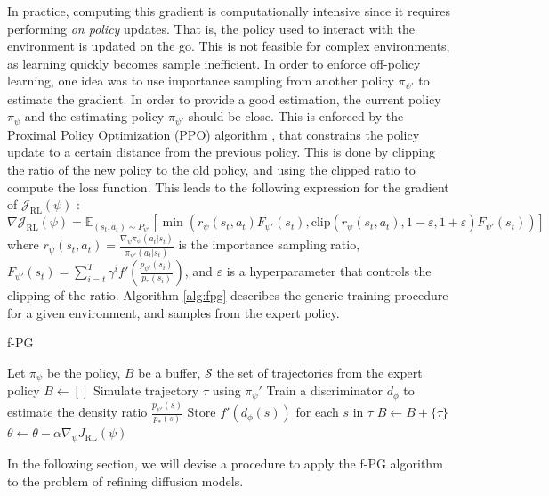 In practice, computing this gradient is computationally intensive since it requires performing \textit{on policy} updates. That is, the policy used to interact with the environment is updated on the go. This is not feasible for complex environments, as learning quickly becomes sample inefficient.
In order to enforce off-policy learning, one idea \citep{agarwal_f-policy_2023} was to use importance sampling from another policy $\pi_{\psi'}$ to estimate the gradient. In order to provide a good estimation, the current policy $\pi_{\psi}$ and the estimating policy $\pi_{\psi'}$ should be close. This is enforced by the Proximal Policy Optimization (PPO) algorithm \citep{schulman2017proximal}, that constrains the policy update to a certain distance from the previous policy. This is done by clipping the ratio of the new policy to the old policy, and using the clipped ratio to compute the loss function. This leads to the following expression for the gradient of $\mathcal{J}_{\mathrm{RL}}(\psi)$ :
\begin{equation}
    \nabla  \mathcal{J}_{\mathrm{RL}}(\psi) =  \mathbb{E}_{(s_{t},a_{t}) \sim P_{ \psi'}} \left[  \min\left(r_{\psi}(s_{t},a_{t})F_{\psi'}(s_{t}),\mathrm{clip}\left(r_{\psi}(s_{t},a_{t}),1-\varepsilon,1+\varepsilon\right)F_{\psi'}(s_{t}) \right)  \right]
\end{equation}
where $r_{\psi}(s_{t},a_{t}) = \frac{\nabla_{\psi} \pi_{\psi}(a_{t}|s_{t})}{\pi_{\psi'}(a_{t}|s_{t})}$ is the importance sampling ratio, $F_{\psi'}(s_{t}) = \sum_{i=t}^{T} \gamma^{i} f'\left( \frac{p_{\psi'}(s_{i})}{p_{*}(s_{i})} \right)$, and $\varepsilon$ is a hyperparameter that controls the clipping of the ratio. Algorithm \ref*{alg:fpg} describes the generic training procedure for a given environment, and samples from the expert policy.
\begin{algorithm}
    \caption{f-PG}
    \label{alg:fpg}
    \begin{algorithmic}[1]
    \State Let $\pi_\psi$ be the policy, $B$ be a buffer, $\mathcal{S}$ the set of trajectories from the expert policy
        \State $B \leftarrow []$
            \State Simulate trajectory $\tau$ using $\pi_\psi'$
            \State Train a discriminator $d_{\phi}$ to estimate the density ratio $\frac{p_{\psi'}(s)}{p_{*}(s)}$
            \State Store $f' \left( d_{\phi}(s) \right)$ for each $s$ in $\tau$
            \State $B \leftarrow B + \{\tau \}$
        \EndFor
            \State $\theta \leftarrow \theta - \alpha \nabla_\psi J_{\mathrm{RL}}(\psi)$
        \EndFor
    \EndFor
    \end{algorithmic}
    \end{algorithm}
In the following section, we will devise a procedure to apply the f-PG algorithm to the problem of refining diffusion models.

